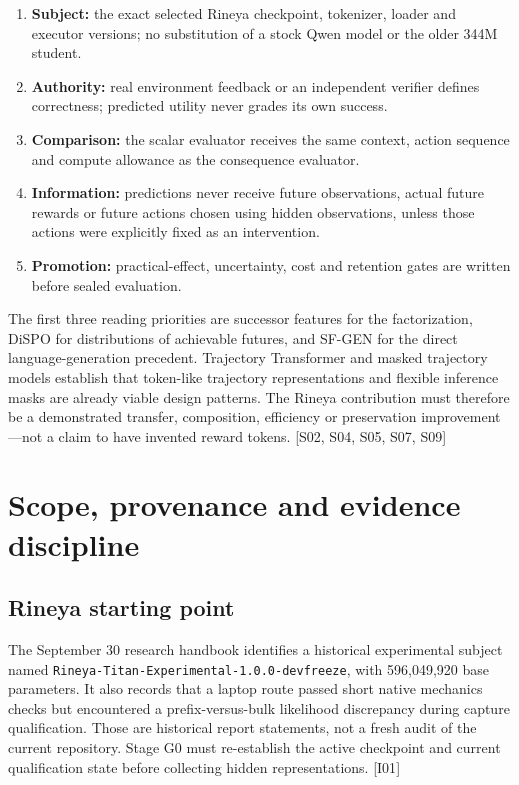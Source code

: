 \documentclass[
  11pt,
  a4paper,
]{article}
\providecommand{\tightlist}{%
  \setlength{\itemsep}{0pt}\setlength{\parskip}{0pt}}
\begin{document}
\begin{enumerate}
\def\labelenumi{\arabic{enumi}.}
\tightlist
\item
  \textbf{Subject:} the exact selected Rineya checkpoint, tokenizer,
  loader and executor versions; no substitution of a stock Qwen model or
  the older 344M student.
\item
  \textbf{Authority:} real environment feedback or an independent
  verifier defines correctness; predicted utility never grades its own
  success.
\item
  \textbf{Comparison:} the scalar evaluator receives the same context,
  action sequence and compute allowance as the consequence evaluator.
\item
  \textbf{Information:} predictions never receive future observations,
  actual future rewards or future actions chosen using hidden
  observations, unless those actions were explicitly fixed as an
  intervention.
\item
  \textbf{Promotion:} practical-effect, uncertainty, cost and retention
  gates are written before sealed evaluation.
\end{enumerate}

The first three reading priorities are successor features for the
factorization, DiSPO for distributions of achievable futures, and SF-GEN
for the direct language-generation precedent. Trajectory Transformer and
masked trajectory models establish that token-like trajectory
representations and flexible inference masks are already viable design
patterns. The Rineya contribution must therefore be a demonstrated
transfer, composition, efficiency or preservation improvement---not a
claim to have invented reward tokens. {[}S02, S04, S05, S07, S09{]}

\section{Scope, provenance and evidence
discipline}\label{scope-provenance-and-evidence-discipline}

\subsection{Rineya starting point}\label{rineya-starting-point}

The September 30 research handbook identifies a historical experimental
subject named \texttt{Rineya-Titan-Experimental-1.0.0-devfreeze}, with
596,049,920 base parameters. It also records that a laptop route passed
short native mechanics checks but encountered a prefix-versus-bulk
likelihood discrepancy during capture qualification. Those are
historical report statements, not a fresh audit of the current
repository. Stage G0 must re-establish the active checkpoint and current
qualification state before collecting hidden representations. {[}I01{]}
\end{document}
